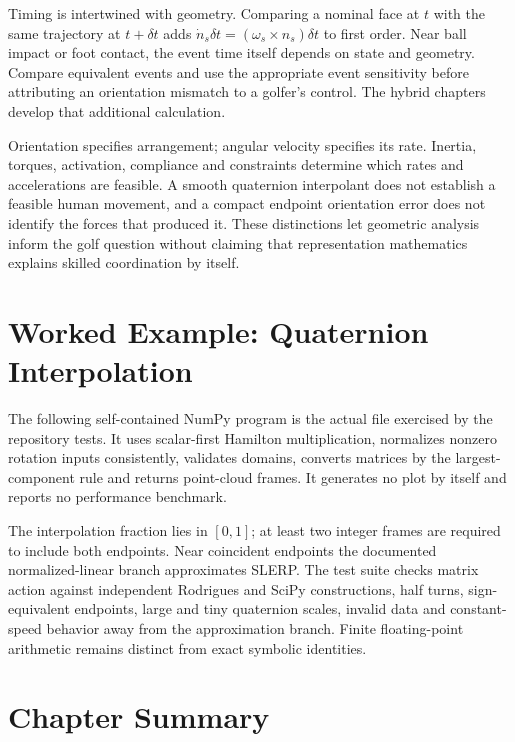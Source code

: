 Timing is intertwined with geometry. Comparing a nominal face at $t$ with the same trajectory at $t+\delta t$ adds $\dot n_s\delta t=(\omega_s\times n_s)\delta t$ to first order. Near ball impact or foot contact, the event time itself depends on state and geometry. Compare equivalent events and use the appropriate event sensitivity before attributing an orientation mismatch to a golfer's control. The hybrid chapters develop that additional calculation.

Orientation specifies arrangement; angular velocity specifies its rate. Inertia, torques, activation, compliance and constraints determine which rates and accelerations are feasible. A smooth quaternion interpolant does not establish a feasible human movement, and a compact endpoint orientation error does not identify the forces that produced it. These distinctions let geometric analysis inform the golf question without claiming that representation mathematics explains skilled coordination by itself.

\section{Worked Example: Quaternion Interpolation}
\label{sec:python_example}

The following self-contained NumPy program is the actual file exercised by the repository tests. It uses scalar-first Hamilton multiplication, normalizes nonzero rotation inputs consistently, validates domains, converts matrices by the largest-component rule and returns point-cloud frames. It generates no plot by itself and reports no performance benchmark.



The interpolation fraction lies in $[0,1]$; at least two integer frames are required to include both endpoints. Near coincident endpoints the documented normalized-linear branch approximates SLERP. The test suite checks matrix action against independent Rodrigues and SciPy constructions, half turns, sign-equivalent endpoints, large and tiny quaternion scales, invalid data and constant-speed behavior away from the approximation branch. Finite floating-point arithmetic remains distinct from exact symbolic identities.

\section{Chapter Summary}
\label{sec:ch4_summary}

